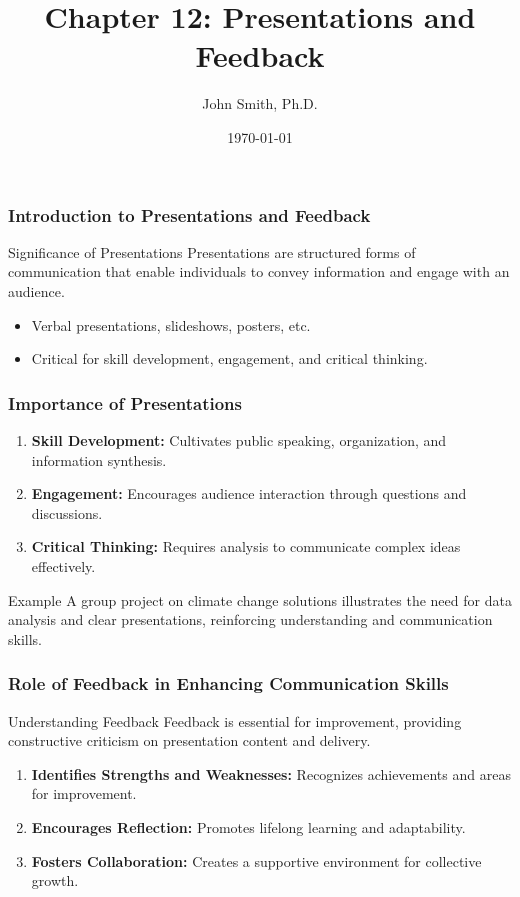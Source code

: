 \documentclass[aspectratio=169]{beamer}
\title[Chapter 12]{Chapter 12: Presentations and Feedback}
\author[J. Smith]{John Smith, Ph.D.}
\institute[University Name]{
  Department of Computer Science\\
  University Name\\
  \vspace{0.3cm}
  Email: email@university.edu\\
  Website: www.university.edu
}
\date{\today}
\begin{document}
\frame{\titlepage}

\begin{frame}[fragile]
    \frametitle{Introduction to Presentations and Feedback}
    \begin{block}{Significance of Presentations}
        Presentations are structured forms of communication that enable individuals to convey information and engage with an audience.
    \end{block}
    \begin{itemize}
        \item Verbal presentations, slideshows, posters, etc.
        \item Critical for skill development, engagement, and critical thinking.
    \end{itemize}
\end{frame}

\begin{frame}[fragile]
    \frametitle{Importance of Presentations}
    \begin{enumerate}
        \item \textbf{Skill Development:} Cultivates public speaking, organization, and information synthesis.
        \item \textbf{Engagement:} Encourages audience interaction through questions and discussions.
        \item \textbf{Critical Thinking:} Requires analysis to communicate complex ideas effectively.
    \end{enumerate}
    \begin{block}{Example}
        A group project on climate change solutions illustrates the need for data analysis and clear presentations, reinforcing understanding and communication skills.
    \end{block}
\end{frame}

\begin{frame}[fragile]
    \frametitle{Role of Feedback in Enhancing Communication Skills}
    \begin{block}{Understanding Feedback}
        Feedback is essential for improvement, providing constructive criticism on presentation content and delivery.
    \end{block}
    \begin{enumerate}
        \item \textbf{Identifies Strengths and Weaknesses:} Recognizes achievements and areas for improvement.
        \item \textbf{Encourages Reflection:} Promotes lifelong learning and adaptability.
        \item \textbf{Fosters Collaboration:} Creates a supportive environment for collective growth.
    \end{enumerate}
\end{frame}
\end{document}
